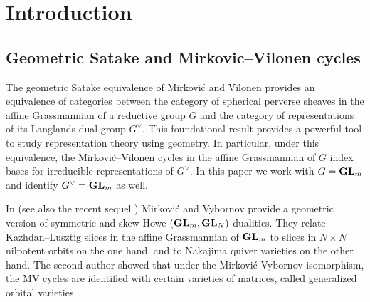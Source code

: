 \documentclass[draft]{article} %
\begin{document}
\section{Introduction}
\label{s:intro}
% 
\subsection{Geometric Satake and Mirkovic--Vilonen cycles}
The geometric Satake equivalence of Mirkovi\'c and Vilonen \cite{mirkovic2007geometric} provides an equivalence of categories between the category of spherical perverse sheaves in the affine Grassmannian of a reductive group $ G $ and the category of representations of its Langlands dual group $G^\vee$.  This foundational result provides a powerful tool to study representation theory using geometry.  In particular, under this equivalence, the Mirkovi\'c--Vilonen cycles in the affine Grassmannian of $ G $ index bases for irreducible representations of $ G^\vee $.  In this paper we work with $ G = {\mathbf{GL}}_m$ and identify $ G^\vee = {\mathbf{GL}}_m$ as well.

In \cite{mirkovic2007quiver} (see also the recent sequel \cite{mirkovic2019comparison}) Mirkovi\'c and Vybornov provide a geometric version of symmetric and skew Howe $({\mathbf{GL}}_m,{\mathbf{GL}}_N)$ dualities.  They relate Kazhdan--Lusztig slices in the affine Grassmannian of ${\mathbf{GL}}_m$ to slices in $N\times N$ nilpotent orbits on the one hand, 
and to Nakajima quiver varieties on the other hand.    The second author \cite{dthesis} showed  that under the Mirkovi\'c-Vybornov isomorphism, the MV cycles are identified with certain varieties of matrices, called generalized orbital varieties.

\end{document}
